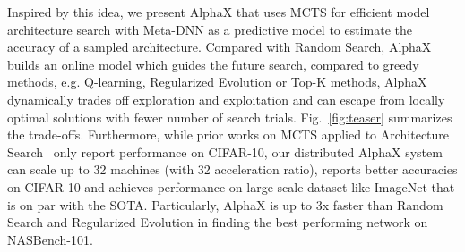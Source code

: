 \documentclass[10pt,twocolumn,letterpaper]{article}
\begin{document}
Inspired by this idea, we present AlphaX that uses MCTS for efficient model architecture search with Meta-DNN as a predictive model to estimate the accuracy of a sampled architecture. Compared with Random Search, AlphaX builds an online model which guides the future search, compared to greedy methods, e.g. Q-learning, Regularized Evolution or Top-K methods, AlphaX dynamically trades off exploration and exploitation and can escape from locally optimal solutions with fewer number of search trials. Fig.~\ref{fig:teaser} summarizes the trade-offs. Furthermore, while prior works on MCTS applied to Architecture Search~\cite{wistuba2017finding, negrinho2017deeparchitect} only report performance on CIFAR-10, our distributed AlphaX system can scale up to 32 machines (with 32 acceleration ratio), reports better accuracies on CIFAR-10 and achieves performance on large-scale dataset like ImageNet that is on par with the SOTA. Particularly, AlphaX is up to 3x faster than Random Search and Regularized Evolution in finding the best performing network on NASBench-101.
\end{document}
